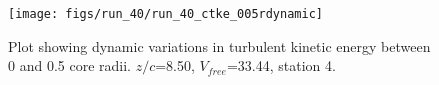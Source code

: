 \begin{figure}[H]
\centering
\texttt{[image: figs/run\_40/run\_40\_ctke\_005rdynamic]}
\caption{Plot showing dynamic variations in turbulent kinetic energy between 0 and 0.5 core radii. $z/c$=8.50, $V_{free}$=33.44, station 4.}
\label{fig:run_40_ctke_005rdynamic}
\end{figure}


